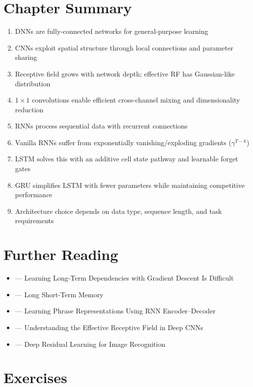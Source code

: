 \section{Chapter Summary}

\begin{enumerate}
    \item DNNs are fully-connected networks for general-purpose learning
    \item CNNs exploit spatial structure through local connections and parameter sharing
    \item Receptive field grows with network depth; effective RF has Gaussian-like distribution
    \item $1 \times 1$ convolutions enable efficient cross-channel mixing and dimensionality reduction
    \item RNNs process sequential data with recurrent connections
    \item Vanilla RNNs suffer from exponentially vanishing/exploding gradients ($\gamma^{T-k}$)
    \item LSTM solves this with an additive cell state pathway and learnable forget gates
    \item GRU simplifies LSTM with fewer parameters while maintaining competitive performance
    \item Architecture choice depends on data type, sequence length, and task requirements
\end{enumerate}

\section{Further Reading}

\begin{itemize}
    \item \cite{bengio1994learning} --- Learning Long-Term Dependencies with Gradient Descent Is Difficult
    \item \cite{hochreiter1997long} --- Long Short-Term Memory
    \item \cite{cho2014properties} --- Learning Phrase Representations Using RNN Encoder--Decoder
    \item \cite{luo2016understanding} --- Understanding the Effective Receptive Field in Deep CNNs
    \item \cite{he2016deep} --- Deep Residual Learning for Image Recognition
\end{itemize}

\section{Exercises}


